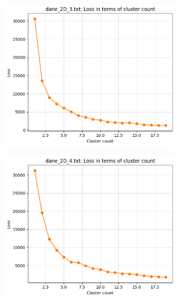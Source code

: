 \documentclass[polish,12pt,a4paper]{extarticle}
\begin{document}
\begin{figure}[h!]
\begin{subfigure}[b]{0.30\textwidth}
        \captionsetup{labelformat=empty}
    \end{subfigure}
    \hfill
    \begin{subfigure}[b]{0.30\textwidth}
        \includegraphics[width=\linewidth]{img/elbow/data3.png}
        \captionsetup{labelformat=empty}
    \end{subfigure}
    \hfill
    \begin{subfigure}[b]{0.30\textwidth}
        \includegraphics[width=\linewidth]{img/elbow/data4.png}
        \captionsetup{labelformat=empty}

\end{subfigure}
\end{figure}
\end{document}
